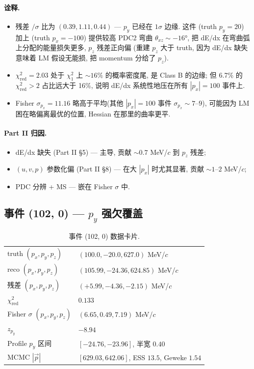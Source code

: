 \paragraph{诠释.}
\begin{itemize}[nosep]
  \item 残差 $/\sigma$ 比为 $(0.39, 1.11, 0.44)$ — $p_y$ 已经在 $1\sigma$ 边缘. 这件 (truth $p_y = 20$) 加上 (truth $p_x = -100$) 提供较高 PDC2 弯曲 $\theta_{xz} \sim -16°$, 把 dE/dx 在弯曲弧上分配的能量损失更多, $p_z$ 残差正向偏 (重建 $p_z$ 大于 truth, 因为 dE/dx 缺失意味着 LM 假设无能损, 把 momentum 分给了 $p_z$).
  \item $\chi^2_{\mathrm{red}} = 2.03$ 处于 $\chi^2_1$ 上 $\sim 16\%$ 的概率密度尾, 是 Class B 的边缘; 但 6.7\% 的 $\chi^2_{\mathrm{red}} > 2$ 占比远大于 16\%, 说明 dE/dx 系统性地压在所有 $|p_x| = 100$ 事件上.
  \item Fisher $\sigma_{p_x} = 11.16$ 略高于平均(其他 $|p_x| = 100$ 事件 $\sigma_{p_x} \sim 7$--$9$), 可能因为 LM 困在略偏离最优的位置, Hessian 在那里的曲率更平.
\end{itemize}

\paragraph{Part II 归因.}
\begin{itemize}[nosep]
  \item dE/dx 缺失 (Part II §5) — 主导, 贡献 $\sim 0.7$ MeV/$c$ 到 $p_z$ 残差;
  \item $(u, v, p)$ 参数化偏 (Part II §8) — 在大 $|p_x|$ 时尤其显著, 贡献 $\sim 1$--$2$ MeV/$c$;
  \item PDC 分辨 + MS — 嵌在 Fisher $\sigma$ 中.
\end{itemize}

\subsection{事件 (102, 0) — $p_y$ 强欠覆盖}
\label{sec:partIII:case_studies:event_102}

\begin{table}[H]
\centering\small
\caption{事件 (102, 0) 数据卡片.}
\begin{tabular}{ll}
\toprule
truth $(p_x, p_y, p_z)$ & $(100.0, -20.0, 627.0)$ MeV/$c$ \\
reco $(p_x, p_y, p_z)$ & $(105.99, -24.36, 624.85)$ MeV/$c$ \\
残差 $(p_x, p_y, p_z)$ & $(+5.99, -4.36, -2.15)$ MeV/$c$ \\
$\chi^2_{\mathrm{red}}$ & $0.133$ \\
Fisher $\sigma$ $(p_x, p_y, p_z)$ & $(6.65, 0.49, 7.19)$ MeV/$c$ \\
$z_{p_y}$ & $-8.94$ \\
Profile $p_y$ 区间 & $[-24.76, -23.96]$, 半宽 $0.40$ \\
MCMC $|\vec p|$ & $[629.03, 642.06]$, ESS $13.5$, Geweke $1.54$ \\
\bottomrule
\end{tabular}
\end{table}

